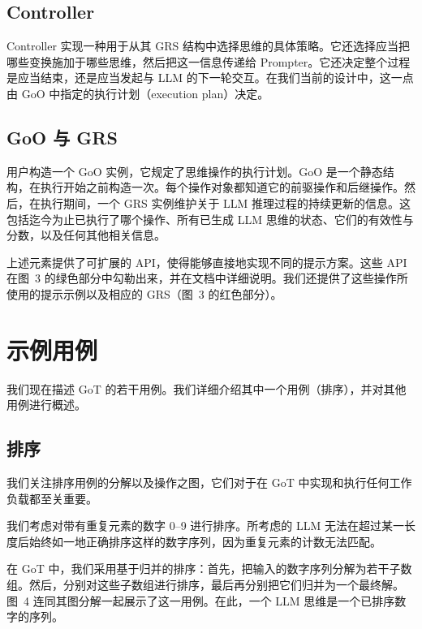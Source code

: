 \documentclass[11pt,UTF8,fontset=fandol]{ctexart}
\begin{document}
\subsection{Controller}

Controller 实现一种用于从其 GRS 结构中选择思维的具体策略。它还选择应当把哪些变换施加于哪些思维，然后把这一信息传递给 Prompter。它还决定整个过程是应当结束，还是应当发起与 LLM 的下一轮交互。在我们当前的设计中，这一点由 GoO 中指定的执行计划（execution plan）决定。

\subsection{GoO 与 GRS}

用户构造一个 GoO 实例，它规定了思维操作的执行计划。GoO 是一个静态结构，在执行开始之前构造一次。每个操作对象都知道它的前驱操作和后继操作。然后，在执行期间，一个 GRS 实例维护关于 LLM 推理过程的持续更新的信息。这包括迄今为止已执行了哪个操作、所有已生成 LLM 思维的状态、它们的有效性与分数，以及任何其他相关信息。

上述元素提供了可扩展的 API，使得能够直接地实现不同的提示方案。这些 API 在图~3 的绿色部分中勾勒出来，并在文档中详细说明。我们还提供了这些操作所使用的提示示例以及相应的 GRS（图~3 的红色部分）。

\section{示例用例}

我们现在描述 GoT 的若干用例。我们详细介绍其中一个用例（排序），并对其他用例进行概述。

\subsection{排序}

我们关注排序用例的分解以及操作之图，它们对于在 GoT 中实现和执行任何工作负载都至关重要。

我们考虑对带有重复元素的数字 0--9 进行排序。所考虑的 LLM 无法在超过某一长度后始终如一地正确排序这样的数字序列，因为重复元素的计数无法匹配。

在 GoT 中，我们采用基于归并的排序：首先，把输入的数字序列分解为若干子数组。然后，分别对这些子数组进行排序，最后再分别把它们归并为一个最终解。图~4 连同其图分解一起展示了这一用例。在此，一个 LLM 思维是一个已排序数字的序列。
\end{document}
